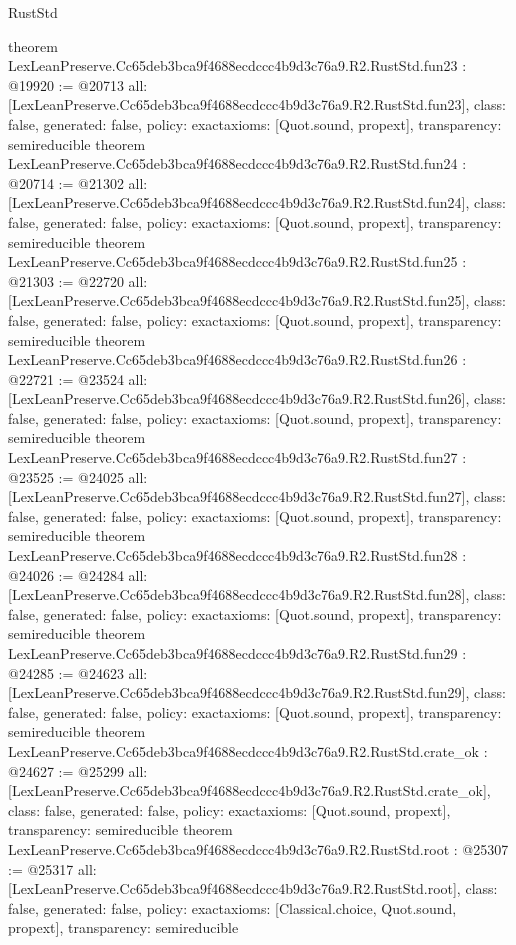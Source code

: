 \begin{lexlean}{RustStd}
\begin{coremodule}
{}
theorem LexLeanPreserve.Cc65deb3bca9f4688ecdccc4b9d3c76a9.R2.RustStd.fun23 : @19920 := @20713 {
  all: [LexLeanPreserve.Cc65deb3bca9f4688ecdccc4b9d3c76a9.R2.RustStd.fun23],
  class: false,
  generated: false,
  policy: exact{axioms: [Quot.sound, propext]},
  transparency: semireducible
}
theorem LexLeanPreserve.Cc65deb3bca9f4688ecdccc4b9d3c76a9.R2.RustStd.fun24 : @20714 := @21302 {
  all: [LexLeanPreserve.Cc65deb3bca9f4688ecdccc4b9d3c76a9.R2.RustStd.fun24],
  class: false,
  generated: false,
  policy: exact{axioms: [Quot.sound, propext]},
  transparency: semireducible
}
theorem LexLeanPreserve.Cc65deb3bca9f4688ecdccc4b9d3c76a9.R2.RustStd.fun25 : @21303 := @22720 {
  all: [LexLeanPreserve.Cc65deb3bca9f4688ecdccc4b9d3c76a9.R2.RustStd.fun25],
  class: false,
  generated: false,
  policy: exact{axioms: [Quot.sound, propext]},
  transparency: semireducible
}
theorem LexLeanPreserve.Cc65deb3bca9f4688ecdccc4b9d3c76a9.R2.RustStd.fun26 : @22721 := @23524 {
  all: [LexLeanPreserve.Cc65deb3bca9f4688ecdccc4b9d3c76a9.R2.RustStd.fun26],
  class: false,
  generated: false,
  policy: exact{axioms: [Quot.sound, propext]},
  transparency: semireducible
}
theorem LexLeanPreserve.Cc65deb3bca9f4688ecdccc4b9d3c76a9.R2.RustStd.fun27 : @23525 := @24025 {
  all: [LexLeanPreserve.Cc65deb3bca9f4688ecdccc4b9d3c76a9.R2.RustStd.fun27],
  class: false,
  generated: false,
  policy: exact{axioms: [Quot.sound, propext]},
  transparency: semireducible
}
theorem LexLeanPreserve.Cc65deb3bca9f4688ecdccc4b9d3c76a9.R2.RustStd.fun28 : @24026 := @24284 {
  all: [LexLeanPreserve.Cc65deb3bca9f4688ecdccc4b9d3c76a9.R2.RustStd.fun28],
  class: false,
  generated: false,
  policy: exact{axioms: [Quot.sound, propext]},
  transparency: semireducible
}
theorem LexLeanPreserve.Cc65deb3bca9f4688ecdccc4b9d3c76a9.R2.RustStd.fun29 : @24285 := @24623 {
  all: [LexLeanPreserve.Cc65deb3bca9f4688ecdccc4b9d3c76a9.R2.RustStd.fun29],
  class: false,
  generated: false,
  policy: exact{axioms: [Quot.sound, propext]},
  transparency: semireducible
}
theorem LexLeanPreserve.Cc65deb3bca9f4688ecdccc4b9d3c76a9.R2.RustStd.crate_ok : @24627 := @25299 {
  all: [LexLeanPreserve.Cc65deb3bca9f4688ecdccc4b9d3c76a9.R2.RustStd.crate_ok],
  class: false,
  generated: false,
  policy: exact{axioms: [Quot.sound, propext]},
  transparency: semireducible
}
theorem LexLeanPreserve.Cc65deb3bca9f4688ecdccc4b9d3c76a9.R2.RustStd.root : @25307 := @25317 {
  all: [LexLeanPreserve.Cc65deb3bca9f4688ecdccc4b9d3c76a9.R2.RustStd.root],
  class: false,
  generated: false,
  policy: exact{axioms: [Classical.choice, Quot.sound, propext]},
  transparency: semireducible
}


\end{coremodule}
\end{lexlean}
